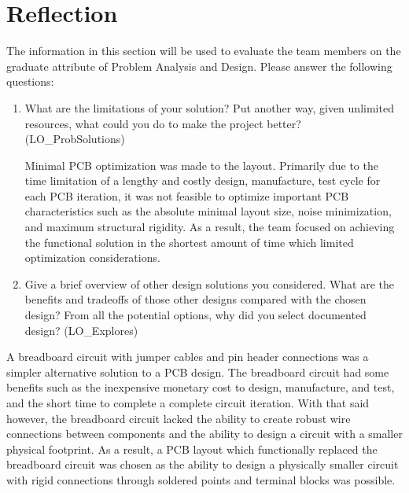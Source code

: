 \documentclass[12pt, titlepage]{article}
\begin{document}
\section{Reflection}

The information in this section will be used to evaluate the team members on the
graduate attribute of Problem Analysis and Design.  Please answer the following questions:

\begin{enumerate}
  \item What are the limitations of your solution?  Put another way, given
  unlimited resources, what could you do to make the project better? (LO\_ProbSolutions)

  Minimal PCB optimization was made to the layout. Primarily due to the time limitation of a lengthy and costly design, manufacture, test cycle for each PCB iteration, it was not feasible to optimize important PCB characteristics such as the absolute minimal layout size, noise minimization, and maximum structural rigidity. As a result, the team focused on achieving the functional solution in the shortest amount of time which limited optimization considerations. \\

  \item Give a brief overview of other design solutions you considered.  What
  are the benefits and tradeoffs of those other designs compared with the chosen
  design?  From all the potential options, why did you select documented design?
  (LO\_Explores)
\end{enumerate}
  A breadboard circuit with jumper cables and pin header connections was a simpler alternative solution to a PCB design. The breadboard circuit had some benefits such as the inexpensive monetary cost to design, manufacture, and test, and the short time to complete a complete circuit iteration. With that said however, the breadboard circuit lacked the ability to create robust wire connections between components and the ability to design a circuit with a smaller physical footprint. As a result, a PCB layout which functionally replaced the breadboard circuit was chosen as the ability to design a physically smaller circuit with rigid connections through soldered points and terminal blocks was possible. \\
\end{document}
